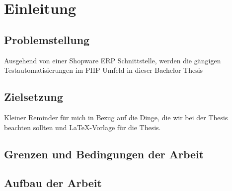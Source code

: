 \section{Einleitung}
\subsection{Problemstellung}
Ausgehend von einer Shopware ERP Schnittstelle, werden die gängigen Testautomatisierungen im PHP Umfeld in dieser Bachelor-Thesis	 	


\subsection{Zielsetzung}
Kleiner Reminder für mich in Bezug auf die Dinge, die wir bei der Thesis beachten sollten und \LaTeX{}-Vorlage für die Thesis.

\subsection{Grenzen und Bedingungen der Arbeit}

\subsection{Aufbau der Arbeit}
